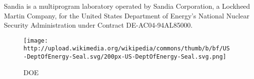 \documentclass[11pt]{article}
\makeatletter
\def\maxwidth{\ifdim\Gin@nat@width>\linewidth\linewidth
    \else\Gin@nat@width\fi}
\let\Oldincludegraphics\includegraphics
\renewcommand{\includegraphics}[1]{\Oldincludegraphics[width=.8\maxwidth]{#1}}
\makeatother
\begin{document}
Sandia is a multiprogram laboratory operated by Sandia Corporation, a
Lockheed Martin Company, for the United States Department of Energy's
National Nuclear Security Administration under Contract
DE-AC04-94AL85000.

\begin{figure}
\centering
\texttt{[image: http://upload.wikimedia.org/wikipedia/commons/thumb/b/bf/US-DeptOfEnergy-Seal.svg/200px-US-DeptOfEnergy-Seal.svg.png]}
\caption{DOE}
\end{figure}


    
    
    
    
\end{document}

